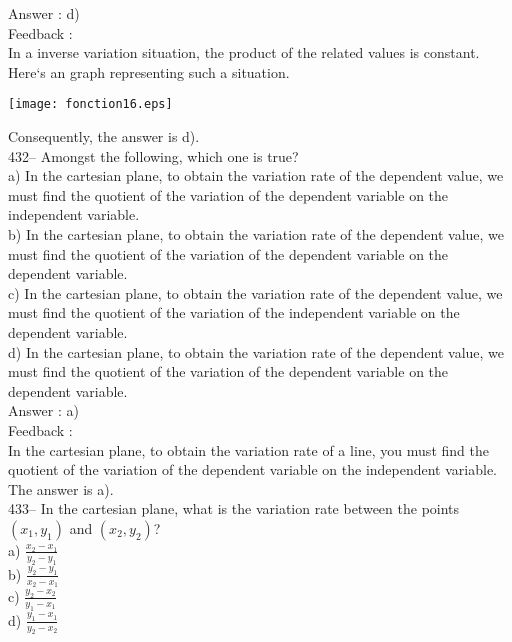 \documentclass[letterpaper, 12pt]{article}
\begin{document}
Answer :  d)\\

Feedback : \\
In a inverse variation situation, the product of the related values
is constant. Here`s an graph representing such a situation.\\
    \begin{center}
    \texttt{[image: fonction16.eps]}
    \end{center}

Consequently, the answer is d).\\




432-- Amongst the following, which one is true?\\
a) In the cartesian plane, to obtain the variation rate of the dependent value, we must find the quotient of the variation of the
dependent variable on the independent variable.\\
b) In the cartesian plane, to obtain the variation rate of the dependent value, we must find the quotient of the variation of the
dependent variable on the dependent variable.\\
c) In the cartesian plane, to obtain the variation rate of the dependent value, we must find the quotient of the variation of the
independent variable on the dependent variable.\\
d) In the cartesian plane, to obtain the variation rate of the dependent value, we must find the quotient of the variation of the
dependent variable on the dependent variable.\\

Answer :  a)\\

Feedback : \\
In the cartesian plane, to obtain the variation rate of a line, you must find the quotient of the variation of the dependent variable on the independent variable.  The answer is a).\\

433-- In the cartesian plane, what is the variation rate between the points $\left( x_1,y_1\right)$ and $\left( x_2,y_2\right) $?\\
a) $\frac{x_2-x_1}{y_2-y_1}$\\[2mm]
b) $\frac{y_2-y_1}{x_2-x_1}$\\[2mm]
c) $\frac{y_2-x_2}{y_1-x_1}$\\[2mm]
d) $\frac{y_1-x_1}{y_2-x_2}$\\[2mm]
\end{document}
